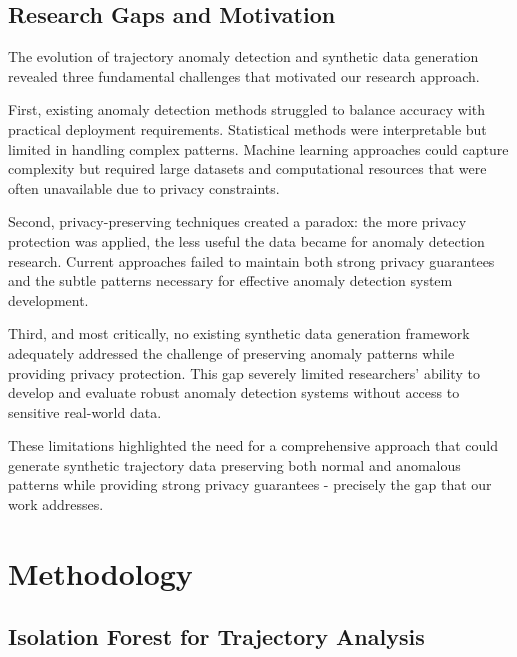 \documentclass[runningheads]{llncs}
\begin{document}
\subsection{Research Gaps and Motivation}
\label{sec:gaps}

The evolution of trajectory anomaly detection and synthetic data generation revealed three fundamental challenges that motivated our research approach.

First, existing anomaly detection methods struggled to balance accuracy with practical deployment requirements. Statistical methods were interpretable but limited in handling complex patterns. Machine learning approaches could capture complexity but required large datasets and computational resources that were often unavailable due to privacy constraints.

Second, privacy-preserving techniques created a paradox: the more privacy protection was applied, the less useful the data became for anomaly detection research. Current approaches failed to maintain both strong privacy guarantees and the subtle patterns necessary for effective anomaly detection system development.

Third, and most critically, no existing synthetic data generation framework adequately addressed the challenge of preserving anomaly patterns while providing privacy protection. This gap severely limited researchers' ability to develop and evaluate robust anomaly detection systems without access to sensitive real-world data.

These limitations highlighted the need for a comprehensive approach that could generate synthetic trajectory data preserving both normal and anomalous patterns while providing strong privacy guarantees - precisely the gap that our work addresses.

\section{Methodology}
\label{sec:methodology}


\subsection{Isolation Forest for Trajectory Analysis}
\label{sec:iso}
\end{document}
